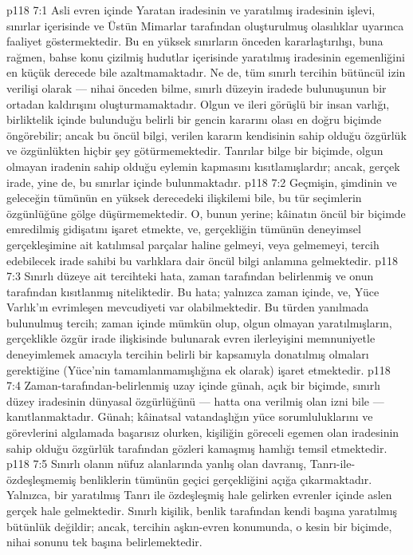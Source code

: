 \vs p118 7:1 Asli evren içinde Yaratan iradesinin ve yaratılmış iradesinin işlevi, sınırlar içerisinde ve Üstün Mimarlar tarafından oluşturulmuş olasılıklar uyarınca faaliyet göstermektedir. Bu en yüksek sınırların önceden kararlaştırılışı, buna rağmen, bahse konu çizilmiş hudutlar içerisinde yaratılmış iradesinin egemenliğini en küçük derecede bile azaltmamaktadır. Ne de, tüm sınırlı tercihin bütüncül izin verilişi olarak --- nihai önceden bilme, sınırlı düzeyin iradede bulunuşunun bir ortadan kaldırışını oluşturmamaktadır. Olgun ve ileri görüşlü bir insan varlığı, birliktelik içinde bulunduğu belirli bir gencin kararını olası en doğru biçimde öngörebilir; ancak bu öncül bilgi, verilen kararın kendisinin sahip olduğu özgürlük ve özgünlükten hiçbir şey götürmemektedir. Tanrılar bilge bir biçimde, olgun olmayan iradenin sahip olduğu eylemin kapmasını kısıtlamışlardır; ancak, gerçek irade, yine de, bu sınırlar içinde bulunmaktadır.
\vs p118 7:2 Geçmişin, şimdinin ve geleceğin tümünün en yüksek derecedeki ilişkilemi bile, bu tür seçimlerin özgünlüğüne gölge düşürmemektedir. O, bunun yerine; kâinatın öncül bir biçimde emredilmiş gidişatını işaret etmekte, ve, gerçekliğin tümünün deneyimsel gerçekleşimine ait katılımsal parçalar haline gelmeyi, veya gelmemeyi, tercih edebilecek irade sahibi bu varlıklara dair öncül bilgi anlamına gelmektedir.
\vs p118 7:3 Sınırlı düzeye ait tercihteki hata, zaman tarafından belirlenmiş ve onun tarafından kısıtlanmış niteliktedir. Bu hata; yalnızca zaman içinde, ve, Yüce Varlık’ın evrimleşen mevcudiyeti  var olabilmektedir. Bu türden yanılmada bulunulmuş tercih; zaman içinde mümkün olup, olgun olmayan yaratılmışların, gerçeklikle özgür irade ilişkisinde bulunarak evren ilerleyişini memnuniyetle deneyimlemek amacıyla tercihin belirli bir kapsamıyla donatılmış olmaları gerektiğine (Yüce’nin tamamlanmamışlığına ek olarak) işaret etmektedir.
\vs p118 7:4 Zaman\hyp{}tarafından\hyp{}belirlenmiş uzay içinde günah, açık bir biçimde, sınırlı düzey iradesinin dünyasal özgürlüğünü --- hatta ona verilmiş olan izni bile --- kanıtlanmaktadır. Günah; kâinatsal vatandaşlığın yüce sorumluluklarını ve görevlerini algılamada başarısız olurken, kişiliğin göreceli egemen olan iradesinin sahip olduğu özgürlük tarafından gözleri kamaşmış hamlığı temsil etmektedir.
\vs p118 7:5 Sınırlı olanın nüfuz alanlarında yanlış olan davranış, Tanrı\hyp{}ile\hyp{}özdeşleşmemiş benliklerin tümünün geçici gerçekliğini açığa çıkarmaktadır. Yalnızca, bir yaratılmış Tanrı ile özdeşleşmiş hale gelirken evrenler içinde aslen gerçek hale gelmektedir. Sınırlı kişilik, benlik tarafından kendi başına yaratılmış bütünlük değildir; ancak, tercihin aşkın\hyp{}evren konumunda, o kesin bir biçimde, nihai sonunu tek başına belirlemektedir.

